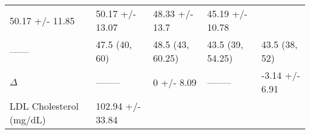 \documentclass[]{article}
\begin{document}
\begin{longtable}[]{@{}lllll@{}}
\begin{minipage}[t]{0.20\columnwidth}
50.17 +/- 11.85\strut
\end{minipage} & \begin{minipage}[t]{0.18\columnwidth}\raggedright
50.17 +/- 13.07\strut
\end{minipage} & \begin{minipage}[t]{0.18\columnwidth}\raggedright
48.33 +/- 13.7\strut
\end{minipage} & \begin{minipage}[t]{0.15\columnwidth}\raggedright
45.19 +/- 10.78\strut
\end{minipage}\tabularnewline
\begin{minipage}[t]{0.15\columnwidth}\raggedright
------\strut
\end{minipage} & \begin{minipage}[t]{0.20\columnwidth}\raggedright
47.5 (40, 60)\strut
\end{minipage} & \begin{minipage}[t]{0.18\columnwidth}\raggedright
48.5 (43, 60.25)\strut
\end{minipage} & \begin{minipage}[t]{0.18\columnwidth}\raggedright
43.5 (39, 54.25)\strut
\end{minipage} & \begin{minipage}[t]{0.15\columnwidth}\raggedright
43.5 (38, 52)\strut
\end{minipage}\tabularnewline
\begin{minipage}[t]{0.15\columnwidth}\raggedright
\(\Delta\)\strut
\end{minipage} & \begin{minipage}[t]{0.20\columnwidth}\raggedright
--------\strut
\end{minipage} & \begin{minipage}[t]{0.18\columnwidth}\raggedright
0 +/- 8.09\strut
\end{minipage} & \begin{minipage}[t]{0.18\columnwidth}\raggedright
--------\strut
\end{minipage} & \begin{minipage}[t]{0.15\columnwidth}\raggedright
-3.14 +/- 6.91\strut
\end{minipage}\tabularnewline
\begin{minipage}[t]{0.15\columnwidth}\raggedright
LDL Cholesterol (mg/dL)\strut
\end{minipage} & \begin{minipage}[t]{0.20\columnwidth}\raggedright
102.94 +/- 33.84\strut
\end{minipage} & \begin{minipage}[t]{0.18\columnwidth}\raggedright

\end{minipage}
\end{longtable}
\end{document}
